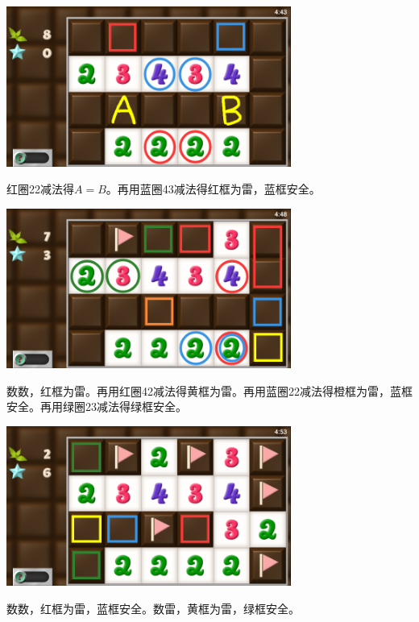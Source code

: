 \subsection{} %
\begin{center}
    \includegraphics[width=0.7\textwidth]{puzzle/54-1.png}
\end{center}
红圈22减法得$A=B$。再用蓝圈43减法得红框为雷，蓝框安全。
\begin{center}
    \includegraphics[width=0.7\textwidth]{puzzle/54-2.png}
\end{center}
数数，红框为雷。再用红圈42减法得黄框为雷。再用蓝圈22减法得橙框为雷，蓝框安全。再用绿圈23减法得绿框安全。
\begin{center}
    \includegraphics[width=0.7\textwidth]{puzzle/54-3.png}
\end{center}
数数，红框为雷，蓝框安全。数雷，黄框为雷，绿框安全。

